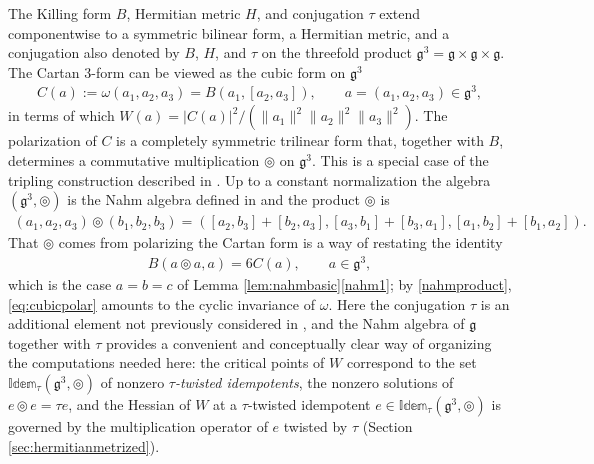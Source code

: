 \documentclass[leqno,10pt]{amsart}
\theoremstyle{definition}
\numberwithin{equation}{section}
\newcommand{\idem}{\mathbb{Idem}}
\newcommand{\tmlt}{\circledcirc}
\newcommand{\om}{\omega}
\newcommand{\g}{\mathfrak{g}}
\newcommand{\norm}[1]{\lVert #1\rVert}
\begin{document}
The Killing form $B$, Hermitian metric $H$, and conjugation $\tau$ extend componentwise to a symmetric bilinear form, a Hermitian metric, and a conjugation also denoted by $B$, $H$, and $\tau$ on the threefold product $\g^{3} = \g \times \g \times \g$. The Cartan $3$-form can be viewed as the cubic form on $\g^{3}$
\begin{align}\label{eq:cubic}
C(a) := \om(a_{1}, a_{2}, a_{3}) = B(a_{1}, [a_{2}, a_{3}]), \qquad a = (a_{1}, a_{2}, a_{3}) \in \g^{3},
\end{align}
in terms of which $W(a) = |C(a)|^{2}/(\norm{a_{1}}^{2}\norm{a_{2}}^{2}\norm{a_{3}}^{2})$. The polarization of $C$ is a completely symmetric trilinear form that, together with $B$, determines a commutative multiplication $\tmlt$ on $\g^{3}$. This is a special case of the tripling construction described in \cite{Fox-cubicpoly, Fox-Tkachev}. Up to a constant normalization the algebra $(\g^{3}, \tmlt)$ is the Nahm algebra defined in \cite{Kinyon-Sagle} and the product $\tmlt$ is \begin{align}\label{nahmproduct}
(a_{1}, a_{2}, a_{3})\tmlt (b_{1}, b_{2}, b_{3}) = ([a_{2}, b_{3}] + [b_{2}, a_{3}],[a_{3}, b_{1}] + [b_{3}, a_{1}] ,[a_{1}, b_{2}] + [b_{1}, a_{2}] ).
\end{align}
That $\tmlt$ comes from polarizing the Cartan form is a way of restating the identity
\begin{align}\label{eq:cubicpolar}
B(a\tmlt a, a) = 6C(a), \qquad a \in \g^{3},
\end{align}
which is the case $a = b = c$ of Lemma \ref{lem:nahmbasic}\ref{nahm1}; by \eqref{nahmproduct}, \eqref{eq:cubicpolar} amounts to the cyclic invariance of $\om$.
Here the conjugation $\tau$ is an additional element not previously considered in \cite{Fox-Tkachev, Kinyon-Sagle}, and the Nahm algebra of $\g$ together with $\tau$ provides a convenient and conceptually clear way of organizing the computations needed here: the critical points of $W$ correspond to the set $\idem_{\tau}(\g^{3}, \tmlt)$ of nonzero \emph{$\tau$-twisted idempotents}, the nonzero solutions of $e \tmlt e = \tau e$, and the Hessian of $W$ at a $\tau$-twisted idempotent $e \in \idem_{\tau}(\g^{3}, \tmlt)$ is governed by the multiplication operator of $e$ twisted by $\tau$ (Section \ref{sec:hermitianmetrized}).
\end{document}
